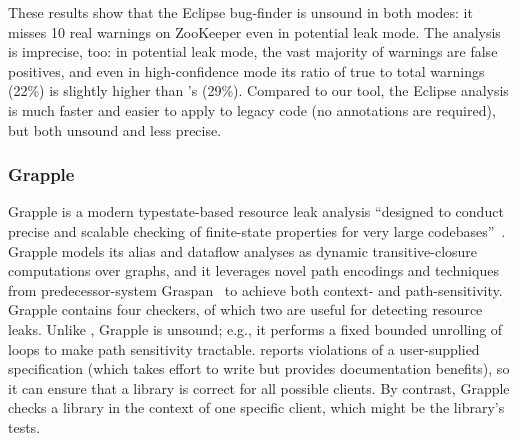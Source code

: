These results show that the Eclipse bug-finder is unsound in both
modes: it misses 10 real warnings on ZooKeeper even in potential leak mode.
The analysis is imprecise, too: in potential leak mode,
the vast majority of warnings are false positives, and even in high-confidence
mode its ratio of true to total warnings
(22\%)
is slightly higher than \tool's
(29\%).
Compared to our tool, the Eclipse analysis
is much faster and easier to apply to legacy code
(no annotations are required), but both unsound
and less precise.



\subsubsection{Grapple}
\label{sec:grapple}

Grapple is a modern typestate-based resource leak analysis
``designed to conduct precise and scalable checking of finite-state properties for very
large codebases''~\cite{zuo2019grapple}. Grapple models its alias and
dataflow analyses as dynamic transitive-closure computations over graphs, and
it leverages novel path encodings and techniques from predecessor-system
Graspan~\cite{wang2017graspan} to achieve both context- and path-sensitivity.  
Grapple contains four checkers, of which two are useful for detecting
resource leaks.  Unlike \tool, Grapple is unsound; e.g., it performs a fixed bounded unrolling
of loops to make path sensitivity tractable.
\Tool reports violations of a user-supplied specification
(which takes effort to write but provides documentation benefits), so it
can ensure that a library is correct for all possible clients.  By
contrast, Grapple checks a library in the context of one specific client,
which might be the library's tests.

